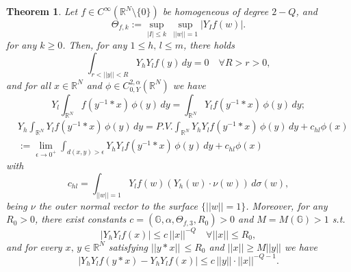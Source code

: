 \documentclass{article}
\newtheorem{theorem}{Theorem}[section]
\numberwithin{equation}{section}
\begin{document}
\begin{theorem}
\label{librone 6.32-6.33-8.24}
    Let $f\in C^{\infty}(\mathbb{R}^N \setminus \{0\})$ be homogeneous of degree $2-Q$, and 
    \begin{equation}
        \label{uniform estimates Y_I Gamma} \Theta_{f,k}:=\sup_{|I| \leq k} \, \sup_{||w||=1} |Y_I f(w)|.
    \end{equation}
    for any $k \geq 0$. Then, for any $1 \leq h, \, l \leq m$, there holds
        \begin{equation}
        \label{vanishing prop Y_h Y_l f}
            \int_{r<||y||<R} Y_h Y_l f(y)\, dy = 0 \quad \forall R>r>0,
        \end{equation}
        and for all $x \in \mathbb{R}^N$ and $\phi \in C^{2,\alpha}_{0,Y}(\mathbb{R}^N)$ we have
        \begin{equation}
        \label{rep formula first derivatives (DCT)}
            Y_l \int_{\mathbb{R}^N} f(y^{-1}*x) \, \phi(y) \, dy = \int_{\mathbb{R}^N} Y_l f(y^{-1}*x) \, \phi(y) \, dy;
        \end{equation}
        \begin{align}
        & \nonumber
            Y_h \int_{\mathbb{R}^N} Y_l f(y^{-1}*x) \, \phi(y) \, dy = P.V. \int_{\mathbb{R}^N} Y_h Y_l f(y^{-1}*x) \, \phi(y) \, dy + c_{hl} \phi(x)\\
        & \label{P.V. formula second derivatives}:= \lim_{\epsilon \to 0^+} \int_{d(x,y)>\epsilon} Y_h Y_l f(y^{-1}*x) \, \phi(y) \, dy + c_{hl} \phi(x)
        \end{align}
        with
        \begin{equation}
            \label{explicit expression c_hl} c_{hl}=\int_{||w||=1} Y_l f(w) \left( Y_h(w) \cdot \nu(w) \right) \, d\sigma(w),
        \end{equation}
        being $\nu$ the outer normal vector to the surface $\{||w||=1\}$. Moreover, for any $R_0>0$, there exist constants $c=(\mathbb{G}, \alpha, \Theta_{f,3},R_0)>0$ and $M=M(\mathbb{G})>1$ s.t.
    \begin{equation}
    \label{elliptic estimate Y_h Y_l f}
            |Y_h Y_l f(x)| \leq c \, ||x||^{-Q} \quad \forall ||x|| \leq R_0,
        \end{equation}
        and for every $x, \, y \in \mathbb{R}^N$ satisfying $||y*x|| \, \leq R_0$ and $||x|| \geq M||y||$ we have
        \begin{equation}
        \label{mean value ineq 6.25}
            |Y_h Y_l f(y * x)-Y_h Y_l f(x)| \leq c \, ||y|| \cdot ||x||^{-Q-1}.
        \end{equation}
\end{theorem}
\end{document}
